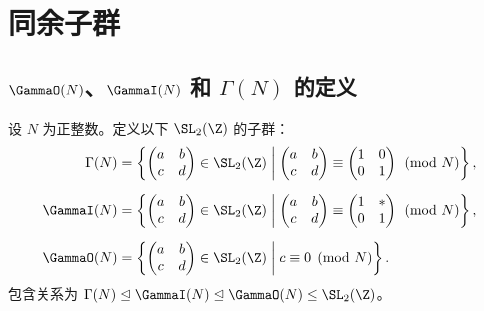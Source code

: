\chapter{同余子群}
\label{ch:congruence-subgroups}

\section{$\GammaO(N)$、$\GammaI(N)$ 和 $\Gamma(N)$ 的定义}

\begin{definition}[同余子群]
设 $N$ 为正整数。定义以下 $\SL_2(\Z)$ 的子群：
\begin{align}
  \Gamma(N) &= \left\{
    \begin{pmatrix} a & b \\ c & d \end{pmatrix} \in \SL_2(\Z)
    \;\middle|\;
    \begin{pmatrix} a & b \\ c & d \end{pmatrix}
    \equiv \begin{pmatrix} 1 & 0 \\ 0 & 1 \end{pmatrix} \pmod{N}
  \right\}, \\[6pt]
  \GammaI(N) &= \left\{
    \begin{pmatrix} a & b \\ c & d \end{pmatrix} \in \SL_2(\Z)
    \;\middle|\;
    \begin{pmatrix} a & b \\ c & d \end{pmatrix}
    \equiv \begin{pmatrix} 1 & * \\ 0 & 1 \end{pmatrix} \pmod{N}
  \right\}, \\[6pt]
  \GammaO(N) &= \left\{
    \begin{pmatrix} a & b \\ c & d \end{pmatrix} \in \SL_2(\Z)
    \;\middle|\;
    c \equiv 0 \pmod{N}
  \right\}.
\end{align}
包含关系为 $\Gamma(N) \trianglelefteq \GammaI(N) \trianglelefteq \GammaO(N)
\leq \SL_2(\Z)$。
\end{definition}

